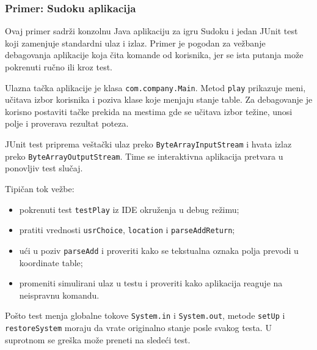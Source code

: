 \subsubsection{Primer: Sudoku aplikacija}\label{sudoku-java-debug-primer}

Ovaj primer sadrži konzolnu Java aplikaciju za igru Sudoku i jedan JUnit test koji zamenjuje standardni ulaz i izlaz. Primer je pogodan za vežbanje debagovanja aplikacije koja čita komande od korisnika, jer se ista putanja može pokrenuti ručno ili kroz test.

Ulazna tačka aplikacije je klasa \texttt{com.company.Main}. Metod \texttt{play} prikazuje meni, učitava izbor korisnika i poziva klase koje menjaju stanje table. Za debagovanje je korisno postaviti tačke prekida na mestima gde se učitava izbor težine, unosi polje i proverava rezultat poteza.

JUnit test priprema veštački ulaz preko \texttt{ByteArrayInputStream} i hvata izlaz preko \texttt{ByteArrayOutputStream}. Time se interaktivna aplikacija pretvara u ponovljiv test slučaj.


Tipičan tok vežbe:

\begin{itemize}
\tightlist
\item
  pokrenuti test \texttt{testPlay} iz IDE okruženja u debug režimu;
\item
  pratiti vrednosti \texttt{usrChoice}, \texttt{location} i \texttt{parseAddReturn};
\item
  ući u poziv \texttt{parseAdd} i proveriti kako se tekstualna oznaka polja prevodi u koordinate table;
\item
  promeniti simulirani ulaz u testu i proveriti kako aplikacija reaguje na neispravnu komandu.
\end{itemize}

Pošto test menja globalne tokove \texttt{System.in} i \texttt{System.out}, metode \texttt{setUp} i \texttt{restoreSystem} moraju da vrate originalno stanje posle svakog testa. U suprotnom se greška može preneti na sledeći test.
